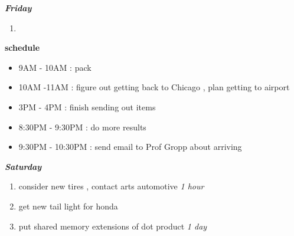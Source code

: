 \documentclass[11pt]{article}
\newcommand{\timeEst}[1]{\textit{#1}}
\begin{document}
\textbf{\textit{Friday}}
\begin{enumerate}
\item

\end{enumerate}

\textbf{schedule}
\begin{itemize}
\item 9AM - 10AM :  pack
\item 10AM -11AM : figure out getting back to Chicago ,  plan getting to airport

\item 3PM - 4PM : finish sending out items
\item 8:30PM - 9:30PM :  do more results
\item 9:30PM - 10:30PM : send email to Prof Gropp about arriving

\end{itemize}

\textbf{\textit{Saturday}}
\begin{enumerate}


\item consider new tires , contact arts automotive \timeEst{1 hour}
\item get new tail light for honda
\item put shared memory extensions of dot product  \timeEst{1 day}
\end{enumerate}




\newpage
\end{document}
